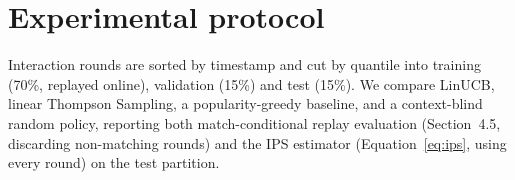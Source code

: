 \section{Experimental protocol}
Interaction rounds are sorted by timestamp and cut by quantile into
training (70\%, replayed online), validation (15\%) and test (15\%). We
compare LinUCB, linear Thompson Sampling, a popularity-greedy baseline, and
a context-blind random policy, reporting both match-conditional replay
evaluation (Section~4.5, discarding non-matching rounds) and the IPS
estimator (Equation~\ref{eq:ips}, using every round) on the test partition.
